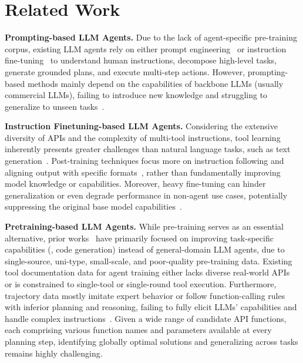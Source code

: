 \section{Related Work}
\label{sec:relatedworks}



\noindent \textbf{Prompting-based LLM Agents.} Due to the lack of agent-specific pre-training corpus, existing LLM agents rely on either prompt engineering~\cite{hsieh2023tool,lu2024chameleon,yao2022react,wang2023voyager} or instruction fine-tuning~\cite{chen2023fireact,zeng2023agenttuning} to understand human instructions, decompose high-level tasks, generate grounded plans, and execute multi-step actions. 
However, prompting-based methods mainly depend on the capabilities of backbone LLMs (usually commercial LLMs), failing to introduce new knowledge and struggling to generalize to unseen tasks~\cite{sun2024adaplanner,zhuang2023toolchain}. 

\noindent \textbf{Instruction Finetuning-based LLM Agents.} Considering the extensive diversity of APIs and the complexity of multi-tool instructions, tool learning inherently presents greater challenges than natural language tasks, such as text generation~\cite{qin2023toolllm}.
Post-training techniques focus more on instruction following and aligning output with specific formats~\cite{patil2023gorilla,hao2024toolkengpt,qin2023toolllm,schick2024toolformer}, rather than fundamentally improving model knowledge or capabilities. 
Moreover, heavy fine-tuning can hinder generalization or even degrade performance in non-agent use cases, potentially suppressing the original base model capabilities~\cite{ghosh2024a}.

\noindent \textbf{Pretraining-based LLM Agents.} While pre-training serves as an essential alternative, prior works~\cite{nijkamp2023codegen,roziere2023code,xu2024lemur,patil2023gorilla} have primarily focused on improving task-specific capabilities (\eg, code generation) instead of general-domain LLM agents, due to single-source, uni-type, small-scale, and poor-quality pre-training data. 
Existing tool documentation data for agent training either lacks diverse real-world APIs~\cite{patil2023gorilla, tang2023toolalpaca} or is constrained to single-tool or single-round tool execution. 
Furthermore, trajectory data mostly imitate expert behavior or follow function-calling rules with inferior planning and reasoning, failing to fully elicit LLMs' capabilities and handle complex instructions~\cite{qin2023toolllm}. 
Given a wide range of candidate API functions, each comprising various function names and parameters available at every planning step, identifying globally optimal solutions and generalizing across tasks remains highly challenging.


